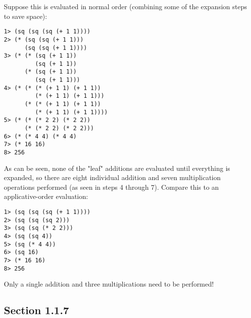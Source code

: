 \documentclass[11pt]{article}
\begin{document}
\begin{enumerate}
Suppose this is evaluated in normal order (combining some of the
expansion steps to save space):

\begin{verbatim}
1> (sq (sq (sq (+ 1 1))))
2> (* (sq (sq (+ 1 1)))
      (sq (sq (+ 1 1))))
3> (* (* (sq (+ 1 1))
         (sq (+ 1 1))
      (* (sq (+ 1 1))
         (sq (+ 1 1)))
4> (* (* (* (+ 1 1) (+ 1 1))
         (* (+ 1 1) (+ 1 1)))
      (* (* (+ 1 1) (+ 1 1))
         (* (+ 1 1) (+ 1 1))))
5> (* (* (* 2 2) (* 2 2))
      (* (* 2 2) (* 2 2)))
6> (* (* 4 4) (* 4 4)
7> (* 16 16)
8> 256
\end{verbatim}

As can be seen, none of the "leaf" additions are evaluated until
everything is expanded, so there are eight individual addition and
seven multiplication operations performed (as seen in steps 4 through
7). Compare this to an applicative-order evaluation:

\begin{verbatim}
1> (sq (sq (sq (+ 1 1))))
2> (sq (sq (sq 2)))
3> (sq (sq (* 2 2)))
4> (sq (sq 4))
5> (sq (* 4 4))
6> (sq 16)
7> (* 16 16)
8> 256
\end{verbatim}

Only a single addition and three multiplications need to be performed!
\end{enumerate}
\subsection{Section 1.1.7}
\label{sec-1-2}
\end{document}
